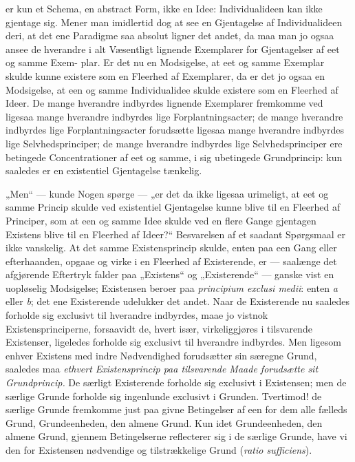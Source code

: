 \documentclass[12pt,a4paper]{book}
\begin{document}
er kun et Schema, en abstract Form, ikke en Idee: Individualideen kan ikke
gjentage sig. Mener man imidlertid dog at see en Gjentagelse af Individualideen
deri, at det ene Paradigme saa absolut ligner det andet, da maa man jo ogsaa
ansee de hverandre i alt Væsentligt lignende Exemplarer for Gjentagelser af eet
og samme Exem-
plar. Er det nu en Modsigelse, at eet og samme Exemplar skulde kunne existere
som en Fleerhed af Exemplarer, da er det jo ogsaa en Modsigelse, at een og samme
Individualidee skulde existere som en Fleerhed af Ideer. De mange hverandre
indbyrdes lignende Exemplarer fremkomme ved ligesaa mange hverandre indbyrdes
lige Forplantningsacter; de mange hverandre indbyrdes lige Forplantningsacter
forudsætte ligesaa mange hverandre indbyrdes lige Selvhedsprinciper; de mange
hverandre indbyrdes lige Selvhedsprinciper ere betingede Concentrationer af eet
og samme, i sig ubetingede Grundprincip: kun saaledes er en existentiel
Gjentagelse tænkelig.

„Men“ --- kunde Nogen spørge --- „er det da ikke ligesaa urimeligt, at eet og
samme Princip skulde ved existentiel Gjentagelse kunne blive til en Fleerhed af
Principer, som at een og samme Idee skulde ved en flere Gange gjentagen Existens
blive til en Fleerhed af Ideer?“ Besvarelsen af et saadant Spørgsmaal er ikke
vanskelig. At det samme Existensprincip skulde, enten paa een Gang eller
efterhaanden, opgaae og virke i en Fleerhed af Existerende, er --- saalænge det
afgjørende Eftertryk falder paa „Existens“ og „Existerende“ --- ganske vist en
uopløselig Modsigelse; Existensen beroer paa \textit{principium exclusi medii}:
enten \textit{a} eller \textit{b}; det ene Existerende udelukker det andet. Naar
de Existerende nu saaledes forholde sig exclusivt til hverandre indbyrdes, maae
jo vistnok Existensprinciperne, forsaavidt de, hvert især, virkeliggjøres i
tilsvarende Existenser, ligeledes forholde sig exclusivt til hverandre
indbyrdes. Men ligesom enhver Existens med indre Nødvendighed forudsætter sin
særegne Grund, saaledes maa \emph{ethvert Existensprincip paa tilsvarende Maade
forudsætte sit Grundprincip.} De særligt Existerende forholde sig exclusivt i
Existensen; men de særlige Grunde forholde sig ingenlunde exclusivt i Grunden.
Tvertimod! de særlige Grunde fremkomme just paa givne Betingelser
af een for dem alle fælleds Grund, Grundeenheden, den almene Grund. Kun idet
Grundeenheden, den almene Grund, gjennem Betingelserne reflecterer sig i de
særlige Grunde, have vi den for Existensen nødvendige og tilstrækkelige Grund
(\textit{ratio sufficiens}).
\end{document}
